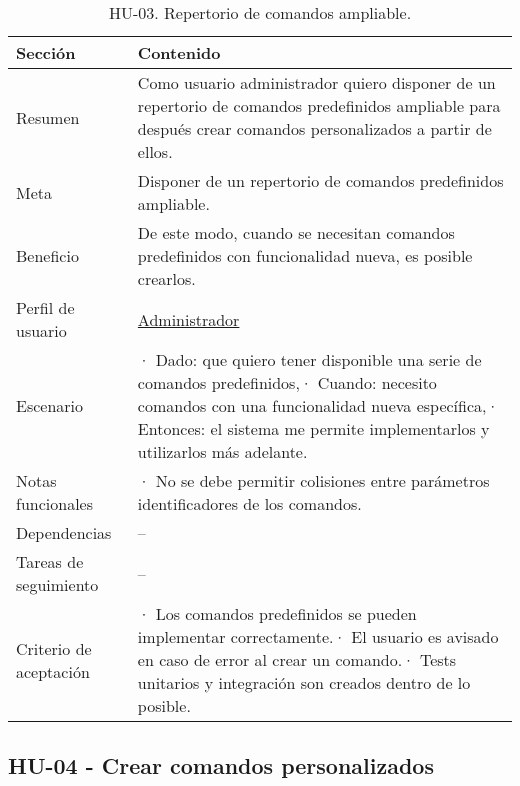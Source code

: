 \begin{table}[H]
    \centering
    \def\arraystretch{1.25}
    \begin{adjustbox}{max width=\textwidth}
    \begin{tabularx}{\textwidth}{|l|L|}
    \hline
        \textbf{Sección} & \textbf{Contenido} \\ \hline
    \hline
        Resumen & Como usuario administrador quiero disponer de un repertorio de comandos predefinidos ampliable para después crear comandos personalizados a partir de ellos. \\ \hline
        Meta & Disponer de un repertorio de comandos predefinidos ampliable. \\ \hline
        Beneficio & De este modo, cuando se necesitan comandos predefinidos con funcionalidad nueva, es posible crearlos. \\ \hline
        Perfil de usuario & \hyperref[sec:personaAdmin]{Administrador} \\ \hline
        Escenario & · Dado: que quiero tener disponible una serie de comandos predefinidos,\linebreak · Cuando: necesito comandos con una funcionalidad nueva específica,\linebreak · Entonces: el sistema me permite implementarlos y utilizarlos más adelante. \\ \hline
        Notas funcionales & · No se debe permitir colisiones entre parámetros identificadores de los comandos. \\ \hline
        Dependencias & – \\ \hline
        Tareas de seguimiento & – \\ \hline
        Criterio de aceptación & · Los comandos predefinidos se pueden implementar correctamente.\linebreak · El usuario es avisado en caso de error al crear un comando.\linebreak · Tests unitarios y integración son creados dentro de lo posible. \\ \hline
    \end{tabularx}
    \end{adjustbox}
    \caption{HU-03. Repertorio de comandos ampliable.}
\end{table}

\subsection{HU-04 - Crear comandos personalizados}
\label{sec:hu04}

